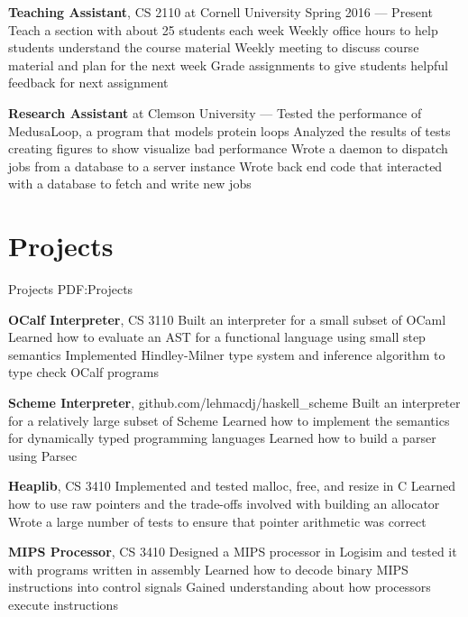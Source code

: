 \documentclass[letterpaper,10pt,oneside]{simpleresume}
\begin{document}
\begin{minipage}[t][0pt]{\linewidth}
\begin{body}
\textbf{Teaching Assistant}, CS 2110 at Cornell University
\hfill
Spring 2016 --- Present
\BulletItem%
Teach a section with about 25 students each week
\BulletItem%
Weekly office hours to help students understand the course material
\BulletItem%
Weekly meeting to discuss course material and plan for the next week
\BulletItem%
Grade assignments to give students helpful feedback for next assignment
\GapNoBreak%

\textbf{Research Assistant} at Clemson University
\hfill
{} --- 
\BulletItem%
Tested the performance of MedusaLoop, a program that models protein loops
\BulletItem%
Analyzed the results of tests creating figures to show visualize bad performance
\BulletItem%
Wrote a daemon to dispatch jobs from a database to a server instance
\BulletItem%
Wrote back end code that interacted with a database to fetch and write new jobs

\section%
{Projects}
{Projects}
{PDF:Projects}

\textbf{OCalf Interpreter}, CS 3110
\BulletItem%
Built an interpreter for a small subset of OCaml
\BulletItem%
Learned how to evaluate an AST for a functional language using small step
semantics
\BulletItem%
Implemented Hindley-Milner type system and inference algorithm to type check
OCalf programs
\GapNoBreak%

\textbf{Scheme Interpreter}, github.com/lehmacdj/haskell\_scheme
\BulletItem%
Built an interpreter for a relatively large subset of Scheme
\BulletItem%
Learned how to implement the semantics for dynamically typed programming
languages
\BulletItem%
Learned how to build a parser using Parsec
\GapNoBreak%

\textbf{Heaplib}, CS 3410
\BulletItem%
Implemented and tested malloc, free, and resize in C
\BulletItem%
Learned how to use raw pointers and the trade-offs involved with building
an allocator
\BulletItem%
Wrote a large number of tests to ensure that pointer arithmetic was correct
\GapNoBreak%

\textbf{MIPS Processor}, CS 3410
\BulletItem%
Designed a MIPS processor in Logisim and tested it with programs written in
assembly
\BulletItem%
Learned how to decode binary MIPS instructions into control signals
\BulletItem%
Gained understanding about how processors execute instructions
\GapNoBreak%


\end{body}
\end{minipage}
\end{document}
